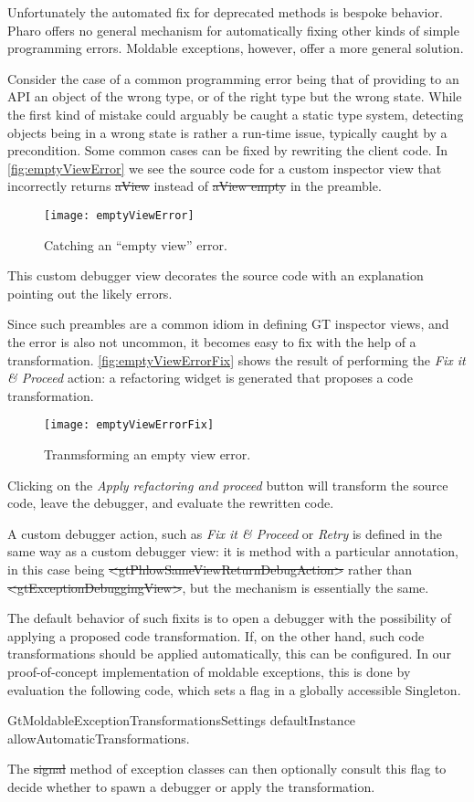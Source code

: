 \documentclass[sigplan,anonymous,review,10pt]{acmart}
\begin{document}
Unfortunately the automated fix for deprecated methods is bespoke behavior.
Pharo offers no general mechanism for automatically fixing other kinds of simple programming errors.
Moldable exceptions, however, offer a more general solution.

Consider the case of a common programming error being that of providing to an API an object of the wrong type, or of the right type but the wrong state.
While the first kind of mistake could arguably be caught a static type system, detecting objects being in a wrong state is rather a run-time issue, typically caught by a precondition.
Some common cases can be fixed by rewriting the client code.
In \autoref{fig:emptyViewError} we see the source code for a custom inspector view that incorrectly returns \st{aView} instead of \st{aView empty} in the preamble.
\begin{figure}[h]
  \texttt{[image: emptyViewError]}
  \caption{Catching an ``empty view'' error.}
  \label{fig:emptyViewError}
\end{figure}
This custom debugger view decorates the source code with an explanation pointing out the likely errors.

Since such preambles are a common idiom in defining GT inspector views, and the error is also not uncommon, it becomes easy to fix with the help of a transformation.
\autoref{fig:emptyViewErrorFix} shows the result of performing the \emph{Fix it \& Proceed} action: a refactoring widget is generated that proposes a code transformation.
\begin{figure}[h]
  \texttt{[image: emptyViewErrorFix]}
  \caption{Tranmsforming an empty view error.}
  \label{fig:emptyViewErrorFix}
\end{figure}
Clicking on the \emph{Apply refactoring and proceed} button will transform the source code, leave the debugger, and evaluate the rewritten code.

A custom debugger action, such as \emph{Fix it \& Proceed} or \emph{Retry} is defined in the same way as a custom debugger view: it is method with a particular annotation, in this case being \st{<gtPhlowSameViewReturnDebugAction>} rather than \mbox{\st{<gtExceptionDebuggingView>}}, but  the mechanism is essentially the same.

The default behavior of such fixits is to open a debugger with the possibility of applying a proposed code transformation.
If, on the other hand, such code transformations should be applied automatically, this can be configured.
In our proof-of-concept implementation of moldable exceptions, this is done by evaluation the following code, which sets a flag in a globally accessible Singleton.
\begin{code}
GtMoldableExceptionTransformationsSettings defaultInstance allowAutomaticTransformations.
\end{code}
The \st{signal} method of exception classes can then optionally consult this flag to decide whether to spawn a debugger or apply the transformation.
\end{document}
